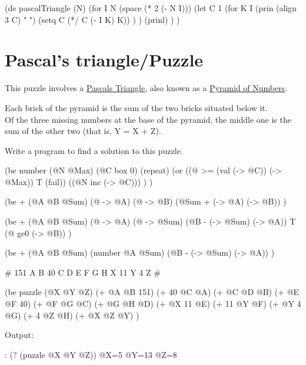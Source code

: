 \begin{wideverbatim}

(de pascalTriangle (N)
   (for I N
      (space (* 2 (- N I)))
      (let C 1
         (for K I
            (prin (align 3 C) " ")
            (setq C (*/ C (- I K) K)) ) )
      (prinl) ) )

\end{wideverbatim}

\pagebreak{}
\section*{Pascal's triangle/Puzzle}

This puzzle involves a
\href{http://xunor.free.fr/en/riddles/auto/pyramidnb.php}{Pascals
  Triangle}, also known as a
\href{http://xunor.free.fr/en/riddles/auto/pyramidnb.php}{Pyramid of
  Numbers}.

\begin{wideverbatim}
           [ 151]
          [  ][  ]
        [40][  ][  ]
      [  ][  ][  ][  ]
    [ X][11][ Y][ 4][ Z]
\end{wideverbatim}

Each brick of the pyramid is the sum of the two bricks situated below
it.\\ Of the three missing numbers at the base of the pyramid, the
middle one is the sum of the other two (that is, Y = X + Z).

Write a program to find a solution to this puzzle.


\begin{wideverbatim}

(be number (@N @Max)
   (@C box 0)
   (repeat)
   (or
      ((@ >= (val (-> @C)) (-> @Max)) T (fail))
      ((@N inc (-> @C))) ) )

(be + (@A @B @Sum)
   (@ -> @A)
   (@ -> @B)
   (@Sum + (-> @A) (-> @B)) )

(be + (@A @B @Sum)
   (@ -> @A)
   (@ -> @Sum)
   (@B - (-> @Sum) (-> @A))
   T
   (@ ge0 (-> @B)) )

(be + (@A @B @Sum)
   (number @A @Sum)
   (@B - (-> @Sum) (-> @A)) )

#{
         151
        A   B
      40  C   D
     E  F  G    H
   X  11  Y   4   Z
}#

(be puzzle (@X @Y @Z)
   (+ @A @B 151)
   (+ 40 @C @A)
   (+ @C @D @B)
   (+ @E @F 40)
   (+ @F @G @C)
   (+ @G @H @D)
   (+ @X 11 @E)
   (+ 11 @Y @F)
   (+ @Y 4 @G)
   (+ 4 @Z @H)
   (+ @X @Z @Y) )

Output:

: (? (puzzle @X @Y @Z))
 @X=5 @Y=13 @Z=8

\end{wideverbatim}

